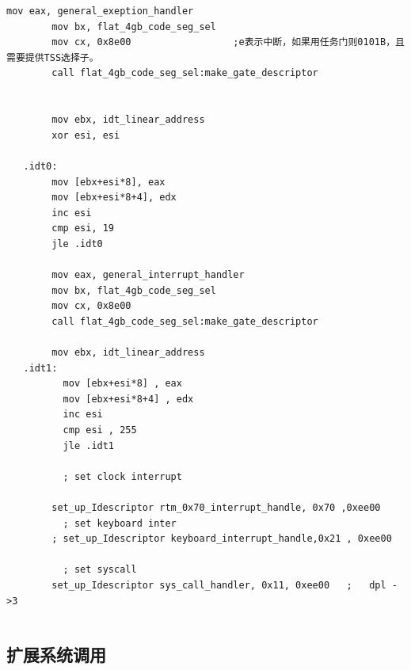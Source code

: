 \documentclass[a4paper,11pt,UTF8]{ctexart}
\begin{document}
	\begin{lstlisting}[language=={[x86masm]Assembler}keywordstyle=\color{blue!70},commentstyle=\color{red!50!green!50!blue!50},frame=shadowbox, rulesepcolor=\color{red!20!green!20!blue!20}]
		mov eax, general_exeption_handler
		mov bx, flat_4gb_code_seg_sel
		mov cx, 0x8e00					;e表示中断，如果用任务门则0101B，且需要提供TSS选择子。
		call flat_4gb_code_seg_sel:make_gate_descriptor
		

		mov ebx, idt_linear_address
		xor esi, esi
   
   .idt0:
		mov [ebx+esi*8], eax
		mov [ebx+esi*8+4], edx
		inc esi
		cmp esi, 19
		jle .idt0

		mov eax, general_interrupt_handler
		mov bx, flat_4gb_code_seg_sel
		mov cx, 0x8e00
		call flat_4gb_code_seg_sel:make_gate_descriptor

		mov ebx, idt_linear_address
   .idt1:
		  mov [ebx+esi*8] , eax
		  mov [ebx+esi*8+4] , edx
		  inc esi
		  cmp esi , 255
		  jle .idt1
   
		  ; set clock interrupt

		set_up_Idescriptor rtm_0x70_interrupt_handle, 0x70 ,0xee00
		  ; set keyboard inter
		; set_up_Idescriptor keyboard_interrupt_handle,0x21 , 0xee00

		  ; set syscall 
		set_up_Idescriptor sys_call_handler, 0x11, 0xee00	;	dpl ->3 

	\end{lstlisting}
	\begin{lstlisting}[language=={[x86masm]Assembler}keywordstyle=\color{blue!70},commentstyle=\color{red!50!green!50!blue!50},frame=shadowbox, rulesepcolor=\color{red!20!green!20!blue!20}]
	\end{lstlisting}
	
	\subsection{扩展系统调用}
\end{document}
